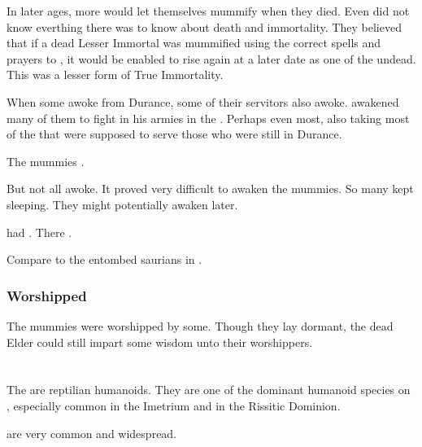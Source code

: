 In later ages, more \ophidians would let themselves mummify when they died.
Even \Sethicus did not know everthing there was to know about death and immortality. 
They believed that if a dead Lesser Immortal was mummified using the correct spells and prayers to \KhothSell, it would be enabled to rise again at a later date as one of the undead. 
This was a lesser form of True Immortality. 

When some \dragons awoke from Durance, some of their servitors also awoke. 
\Sethicus awakened many of them to fight in his armies in the \firstbanewar. 
Perhaps even most, also taking most of the \ophidians that were supposed to serve those \dragons who were still in Durance. 

The \ophidian mummies .

But not all awoke.
It proved very difficult to awaken the \ophidian mummies. 
So many kept sleeping. 
They might potentially awaken later.

 had . 
There . 

Compare to the entombed saurians in \cite{Nile:InTheirDarkenesShrines}. 





\subsubsection{Worshipped}
The mummies were worshipped by some. 
Though they lay dormant, the dead Elder \ophidians could still impart some wisdom unto their worshippers. 
















\section[Scatha]{\Scatha}
The \scathae{} are reptilian humanoids. They are one of the dominant humanoid species on \Miith{}, especially common in the Imetrium and in the Rissitic Dominion. 

\Scathae{} are very common and widespread. %









